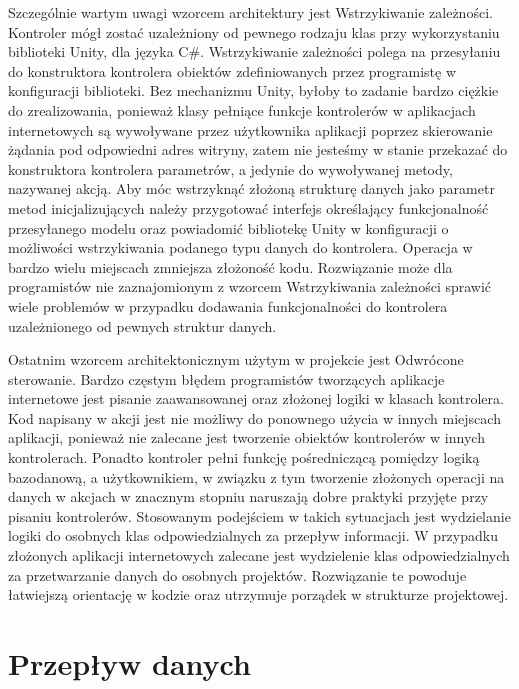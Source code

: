 {Szczególnie wartym uwagi wzorcem architektury jest Wstrzykiwanie zależności. Kontroler mógł zostać uzależniony od pewnego rodzaju klas przy wykorzystaniu biblioteki Unity, dla języka C\#. Wstrzykiwanie zależności polega na przesyłaniu do konstruktora kontrolera obiektów zdefiniowanych przez programistę w konfiguracji biblioteki. Bez mechanizmu Unity, byłoby to zadanie bardzo ciężkie do zrealizowania, ponieważ klasy pełniące funkcje kontrolerów w aplikacjach internetowych są wywoływane przez użytkownika aplikacji poprzez skierowanie żądania pod odpowiedni adres witryny, zatem nie jesteśmy w stanie przekazać do konstruktora kontrolera parametrów, a jedynie do wywoływanej metody, nazywanej akcją. Aby móc wstrzyknąć złożoną strukturę danych jako parametr metod inicjalizujących należy przygotować interfejs określający funkcjonalność przesyłanego modelu oraz powiadomić bibliotekę Unity w konfiguracji o możliwości wstrzykiwania podanego typu danych do kontrolera. Operacja w bardzo wielu miejscach zmniejsza złożoność kodu. Rozwiązanie może dla programistów nie zaznajomionym z wzorcem Wstrzykiwania zależności sprawić wiele problemów w przypadku dodawania funkcjonalności do kontrolera uzależnionego od pewnych struktur danych.

Ostatnim wzorcem architektonicznym użytym w projekcie jest Odwrócone sterowanie. Bardzo częstym błędem programistów tworzących aplikacje internetowe jest pisanie zaawansowanej oraz złożonej logiki w klasach kontrolera. Kod napisany w akcji jest nie możliwy do ponownego użycia w innych miejscach aplikacji, ponieważ nie zalecane jest tworzenie obiektów kontrolerów w innych kontrolerach. Ponadto kontroler pełni funkcję pośredniczącą pomiędzy logiką bazodanową, a użytkownikiem, w związku z tym tworzenie złożonych operacji na danych w akcjach w znacznym stopniu naruszają dobre praktyki przyjęte przy pisaniu kontrolerów. Stosowanym podejściem w takich sytuacjach jest wydzielanie logiki do osobnych klas odpowiedzialnych za przepływ informacji. W przypadku złożonych aplikacji internetowych zalecane jest wydzielenie klas odpowiedzialnych za przetwarzanie danych do osobnych projektów. Rozwiązanie te powoduje łatwiejszą orientację w kodzie oraz utrzymuje porządek w strukturze projektowej.
}

\section{Przepływ danych}

